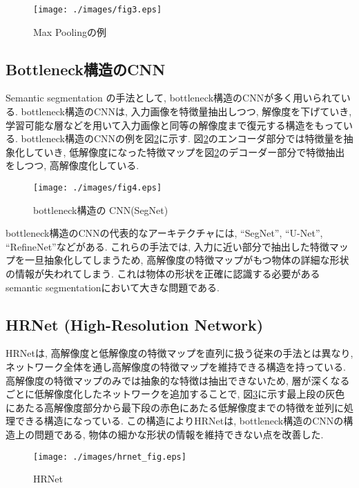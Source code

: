 \begin{figure}[H]
  \centering
  \texttt{[image: ./images/fig3.eps]}
  \caption{Max Poolingの例}
  \label{fig:pooling}
\end{figure}

\subsection{Bottleneck構造のCNN}\label{subsec:en_de_cnn}
Semantic segmentation の手法として, bottleneck構造のCNNが多く用いられている. 
bottleneck構造のCNNは, 入力画像を特徴量抽出しつつ, 解像度を下げていき, 学習可能な層などを用いて入力画像と同等の解像度まで復元する構造をもっている.
bottleneck構造のCNNの例を図\ref{fig:segnet}に示す. 図\ref{fig:segnet}のエンコーダ部分では特徴量を抽象化していき, 低解像度になった特徴マップを図\ref{fig:segnet}のデコーダー部分で特徴抽出をしつつ, 高解像度化している. 
\begin{figure}[H]
    \centering
    \texttt{[image: ./images/fig4.eps]}
    \caption{bottleneck構造の CNN(SegNet\cite{segnet})}
    \label{fig:segnet}
\end{figure}

bottleneck構造のCNNの代表的なアーキテクチャには, ``SegNet''\cite{segnet}, ``U-Net''\cite{unet}, ``RefineNet''\cite{refinenet}などがある.
これらの手法では, 入力に近い部分で抽出した特徴マップを一旦抽象化してしまうため, 高解像度の特徴マップがもつ物体の詳細な形状の情報が失われてしまう. これは物体の形状を正確に認識する必要があるsemantic segmentationにおいて大きな問題である.

\subsection{HRNet (High-Resolution Network)}\label{subsec:hrnet}
HRNet\cite{hrnet}は, 高解像度と低解像度の特徴マップを直列に扱う従来の手法とは異なり, ネットワーク全体を通し高解像度の特徴マップを維持できる構造を持っている. 高解像度の特徴マップのみでは抽象的な特徴は抽出できないため, 層が深くなるごとに低解像度化したネットワークを追加することで, 図\ref{fig:hrnet}に示す最上段の灰色にあたる高解像度部分から最下段の赤色にあたる低解像度までの特徴を並列に処理できる構造になっている. この構造によりHRNetは, bottleneck構造のCNNの構造上の問題である, 物体の細かな形状の情報を維持できない点を改善した. 

\begin{figure}[H]
    \centering
    \texttt{[image: ./images/hrnet\_fig.eps]}
    \caption{HRNet}
    \label{fig:hrnet}
\end{figure}


